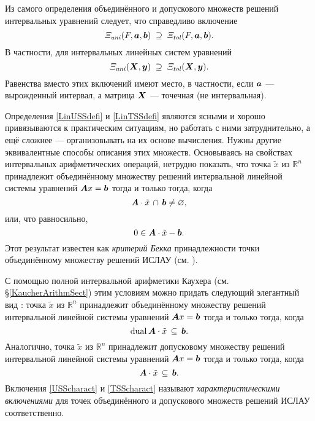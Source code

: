 \documentclass[a5paper,openany]{book}
\newcommand{\mbf}[1]{\protect\text{\boldmath$#1$}}
\newcommand{\mbb}{\mathbb}
\newcommand{\dual}{\mathrm{dual}\,}
\newcommand{\USS}{\varXi_\mathit{\hspace{-0.5pt}uni}}
\newcommand{\TSS}{\varXi_\mathit{\hspace{-0.5pt}tol}}
\begin{document}
Из самого определения объединённого и допускового множеств решений интервальных 
уравнений следует, что справедливо включение 
\begin{equation*} 
\USS(F, \mbf{a}, \mbf{b})\;\supseteq\;\TSS(F,\mbf{a}, \mbf{b}). 
\end{equation*} 
В частности, для интервальных линейных систем уравнений 
\begin{equation*} 
\USS(\mbf{X}, \mbf{y})\;  \supseteq\; \TSS(\mbf{X}, \mbf{y}).    
\end{equation*} 
Равенства вместо этих включений имеют место, в частности, если $\mbf{a}$ --- 
вырожденный интервал, а матрица $\mbf{X}$ --- точечная (не интервальная). 
  
Определения \eqref{LinUSSdefi} и \eqref{LinTSSdefi} являются ясными и хорошо 
привязываются к практическим ситуациям, но работать с ними затруднительно, а ещё 
сложнее --- организовывать на их основе вычисления. Нужны другие эквивалентные 
способы описания этих множеств. Основываясь на свойствах интервальных арифметических 
операций, нетрудно показать, что точка $\tilde{x}$ из $\mbb{R}^n$ принадлежит 
объединённому множеству решений интервальной линейной системы уравнений 
$\mbf{A}x = \mbf{b}$ тогда и только тогда, когда 
\begin{equation*} 
\mbf{A}\cdot \tilde{x}\,\cap\,\mbf{b}\neq\varnothing, 
\end{equation*} 
или, что равносильно, 
\begin{equation*} 
0\in\mbf{A}\cdot \tilde{x} - \mbf{b}.  
\end{equation*} 
Этот результат известен как \emph{критерий Бекка} принадлежности точки объединённому 
множеству решений ИСЛАУ (см. \cite{SSharyBook}).   
  
С помощью полной интервальной арифметики Каухера (см. \S\ref{KaucherArithmSect}) этим 
условиям можно придать следующий элегантный вид \cite{SSharyBook}: точка $\tilde{x}$ 
из $\mbb{R}^n$ принадлежит объединённому множеству решений интервальной линейной 
системы уравнений $\mbf{A}x = \mbf{b}$ тогда и только тогда, когда 
\begin{equation} 
\label{USScharact} 
\dual\mbf{A}\cdot \tilde{x}  \,\subseteq\,\mbf{b}.  
\end{equation} 
Аналогично, точка $\tilde{x}$ из $\mbb{R}^n$ принадлежит допусковому множеству 
решений интервальной линейной системы уравнений $\mbf{A}x = \mbf{b}$ тогда и только 
тогда, когда 
\begin{equation} 
\label{TSScharact}
\mbf{A}\cdot \tilde{x}\,\subseteq\,\mbf{b}. 
\end{equation} 
Включения \eqref{USScharact} и \eqref{TSScharact} называют \emph{характеристическими 
включениями} для точек объединённого и допускового 
множеств решений ИСЛАУ соответственно. 
  
\end{document}
